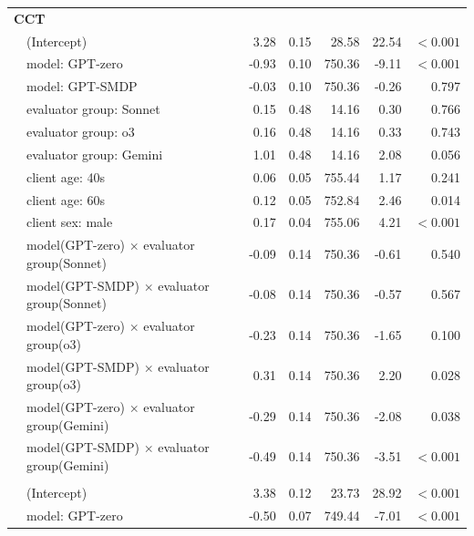 \documentclass{wiley-article}
\begin{document}
{\begin{longtable}{@{}l p{} rrrrr@{}}
  \multicolumn{7}{l}{\textbf{CCT}}\\
    & (Intercept)                                             & 3.28 & 0.15 &  28.58 &  22.54 & $<\!0.001$ \\
    & model: GPT-zero                                         &-0.93 & 0.10 & 750.36 &  -9.11 & $<\!0.001$ \\
    & model: GPT-SMDP                                         &-0.03 & 0.10 & 750.36 &  -0.26 & 0.797 \\
    & evaluator group: Sonnet                                 & 0.15 & 0.48 &  14.16 &   0.30 & 0.766 \\
    & evaluator group: o3                                     & 0.16 & 0.48 &  14.16 &   0.33 & 0.743 \\
    & evaluator group: Gemini                                 & 1.01 & 0.48 &  14.16 &   2.08 & 0.056 \\
    & client age: 40s                                         & 0.06 & 0.05 & 755.44 &   1.17 & 0.241 \\
    & client age: 60s                                         & 0.12 & 0.05 & 752.84 &   2.46 & 0.014 \\
    & client sex: male                                        & 0.17 & 0.04 & 755.06 &   4.21 & $<\!0.001$ \\
    & model(GPT-zero) $\times$ evaluator group(Sonnet)        &-0.09 & 0.14 & 750.36 &  -0.61 & 0.540 \\
    & model(GPT-SMDP) $\times$ evaluator group(Sonnet)        &-0.08 & 0.14 & 750.36 &  -0.57 & 0.567 \\
    & model(GPT-zero) $\times$ evaluator group(o3)            &-0.23 & 0.14 & 750.36 &  -1.65 & 0.100 \\
    & model(GPT-SMDP) $\times$ evaluator group(o3)            & 0.31 & 0.14 & 750.36 &   2.20 & 0.028 \\
    & model(GPT-zero) $\times$ evaluator group(Gemini)        &-0.29 & 0.14 & 750.36 &  -2.08 & 0.038 \\
    & model(GPT-SMDP) $\times$ evaluator group(Gemini)        &-0.49 & 0.14 & 750.36 &  -3.51 & $<\!0.001$ \\
  \addlinespace
  \multicolumn{7}{l}{\textbf{SST}}\\
    & (Intercept)                                             & 3.38 & 0.12 &  23.73 &  28.92 & $<\!0.001$ \\
    & model: GPT-zero                                         &-0.50 & 0.07 & 749.44 &  -7.01 & $<\!0.001$ \\

\end{longtable}}
\end{document}
